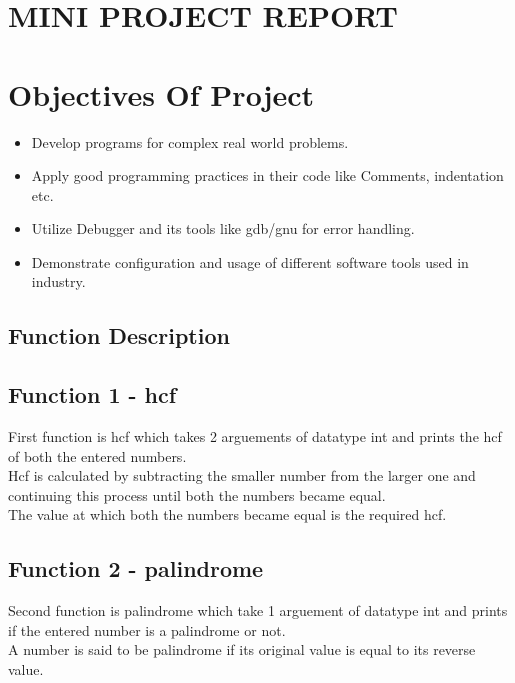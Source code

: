 \documentclass[12pt,a4paper]{article}
\begin{document}
\begin{center}
\section*{\textbf{\Huge MINI PROJECT REPORT }}
\section*{\textbf{\Large Objectives Of Project}}
\end{center}
\begin{itemize}
\item Develop programs for complex real world problems. 
\item Apply good programming practices in their code like Comments, indentation etc. 
\item Utilize Debugger and its tools like gdb/gnu for error handling.
\item Demonstrate configuration and usage of different software tools used in industry.
\end{itemize}
\pagebreak

\begin{center}
\section*{\textbf{\Large Function Description}}
\end{center}
\subsection*{Function 1 - hcf}
First function is hcf which takes 2 arguements of datatype int and prints the hcf of both the entered numbers.
\\
Hcf is calculated by subtracting the smaller number from the larger one and continuing this process until both the numbers became equal.
\\
The value at which both the numbers became equal is the required hcf. 
\\

\subsection*{Function 2 - palindrome}
Second function is palindrome which take 1 arguement of datatype int and prints if the entered number is a palindrome or not.
\\
A number is said to be palindrome if its original value is equal to its reverse value.
\\
\end{document}
